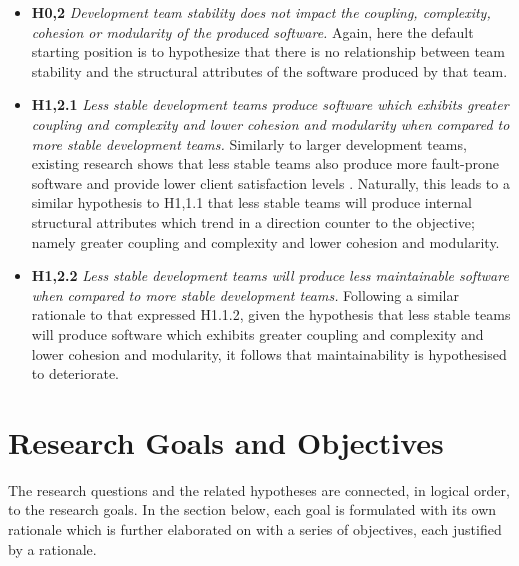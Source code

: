 \begin{itemize}
\begin{itemize}
\item \textbf{H0,2} \textit{Development team stability does not impact the coupling, complexity, cohesion or modularity of the produced software.} Again, here the default starting position is to hypothesize that there is no relationship between team stability and the structural attributes of the software produced by that team. 
\item \textbf{H1,2.1} \textit{Less stable development teams produce software which exhibits greater coupling and complexity and lower cohesion and modularity when compared to more stable development teams.} Similarly to larger development teams, existing research shows that less stable teams also produce more fault-prone software and provide lower client satisfaction levels \citep{huckman2009team, gardner2012dynamically}. Naturally, this leads to a similar hypothesis to H1,1.1 that less stable teams will produce internal structural attributes which trend in a direction counter to the objective; namely greater coupling and complexity and lower cohesion and modularity.
\item \textbf{H1,2.2} \textit{Less stable development teams will produce less maintainable software when compared to more stable development teams.} Following a similar rationale to that expressed H1.1.2, given the hypothesis that less stable teams will produce software which exhibits greater coupling and complexity and lower cohesion and modularity, it follows that maintainability is hypothesised to deteriorate.
\end{itemize}
\end{itemize}

\section{Research Goals and Objectives} %
The research questions and the related hypotheses are connected, in logical order, to the research goals. In the section below, each goal is formulated with its own rationale which is further elaborated on with a series of objectives, each justified by a rationale.

